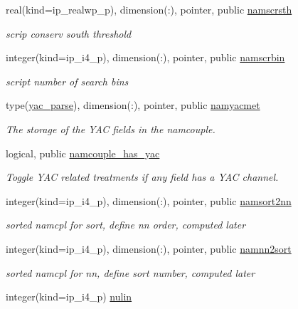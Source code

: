 \begin{DoxyCompactItemize}
real(kind=ip\+\_\+realwp\+\_\+p), dimension(\+:), pointer, public \hyperlink{namespacemod__oasis__namcouple_a50eb998713e5557b9fbb81cab781b6a8}{namscrsth}
\begin{DoxyCompactList}\small\item\em scrip conserv south threshold \end{DoxyCompactList}\item 
integer(kind=ip\+\_\+i4\+\_\+p), dimension(\+:), pointer, public \hyperlink{namespacemod__oasis__namcouple_a728405e8f669b58d00c189abf8b62437}{namscrbin}
\begin{DoxyCompactList}\small\item\em script number of search bins \end{DoxyCompactList}\item 
type(\hyperlink{structmod__oasis__namcouple_1_1yac__parse}{yac\+\_\+parse}), dimension(\+:), pointer, public \hyperlink{namespacemod__oasis__namcouple_a5a6235eee48f0afaa42eedbf807a252e}{namyacmet}
\begin{DoxyCompactList}\small\item\em The storage of the Y\+AC fields in the namcouple. \end{DoxyCompactList}\item 
logical, public \hyperlink{namespacemod__oasis__namcouple_a08ce642a6a26fb318ae50f8c1a6e3f9a}{namcouple\+\_\+has\+\_\+yac}
\begin{DoxyCompactList}\small\item\em Toggle Y\+AC related treatments if any field has a Y\+AC channel. \end{DoxyCompactList}\item 
integer(kind=ip\+\_\+i4\+\_\+p), dimension(\+:), pointer, public \hyperlink{namespacemod__oasis__namcouple_a4555b14f38928b7f0fb7f77b9c42d0a0}{namsort2nn}
\begin{DoxyCompactList}\small\item\em sorted namcpl for sort, define nn order, computed later \end{DoxyCompactList}\item 
integer(kind=ip\+\_\+i4\+\_\+p), dimension(\+:), pointer, public \hyperlink{namespacemod__oasis__namcouple_a0ace7c451d8658759b9c8d871926a76e}{namnn2sort}
\begin{DoxyCompactList}\small\item\em sorted namcpl for nn, define sort number, computed later \end{DoxyCompactList}\item 
integer(kind=ip\+\_\+i4\+\_\+p) \hyperlink{namespacemod__oasis__namcouple_a36ef9483c332254e38c52b1d78d26f1f}{nulin}

\end{DoxyCompactItemize}
